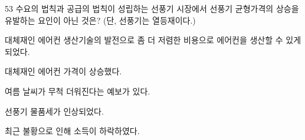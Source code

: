\begin{question}{53}
수요의 법칙과 공급의 법칙이 성립하는 선풍기 시장에서 선풍기 균형가격의 상승을 유발하는 요인이 아닌 것은? (단, 선풍기는 열등재이다.)
\begin{choices}
  \item 대체재인 에어컨 생산기술의 발전으로 좀 더 저렴한 비용으로 에어컨을 생산할 수 있게 되었다.
  \item 대체재인 에어컨 가격이 상승했다.
  \item 여름 날씨가 무척 더워진다는 예보가 있다.
  \item 선풍기 물품세가 인상되었다.
  \item 최근 불황으로 인해 소득이 하락하였다.
\end{choices}
\end{question}
